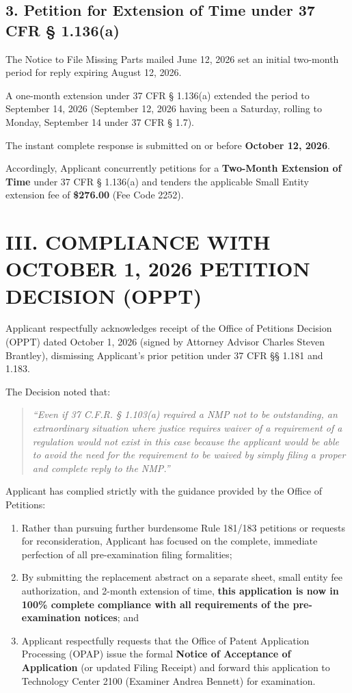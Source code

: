 \documentclass[11pt,letterpaper]{article}
\begin{document}
\subsection*{3. Petition for Extension of Time under 37 CFR \S{} 1.136(a)}

The Notice to File Missing Parts mailed June 12, 2026 set an initial two-month period for reply expiring August 12, 2026. 

A one-month extension under 37 CFR \S{} 1.136(a) extended the period to September 14, 2026 (September 12, 2026 having been a Saturday, rolling to Monday, September 14 under 37 CFR \S{} 1.7). 

The instant complete response is submitted on or before \textbf{October 12, 2026}. 

Accordingly, Applicant concurrently petitions for a \textbf{Two-Month Extension of Time} under 37 CFR \S{} 1.136(a) and tenders the applicable Small Entity extension fee of \textbf{\$276.00} (Fee Code 2252).

\newpage

\section*{III. COMPLIANCE WITH OCTOBER 1, 2026 PETITION DECISION (OPPT)}

Applicant respectfully acknowledges receipt of the Office of Petitions Decision (OPPT) dated October 1, 2026 (signed by Attorney Advisor Charles Steven Brantley), dismissing Applicant's prior petition under 37 CFR \S\S{} 1.181 and 1.183. 

The Decision noted that:
\begin{quote}
\textit{``Even if 37 C.F.R. § 1.103(a) required a NMP not to be outstanding, an extraordinary situation where justice requires waiver of a requirement of a regulation would not exist in this case because the applicant would be able to avoid the need for the requirement to be waived by simply filing a proper and complete reply to the NMP.''}
\end{quote}

Applicant has complied strictly with the guidance provided by the Office of Petitions:
\begin{enumerate}[leftmargin=2em, itemsep=2pt, parsep=0pt]
    \item Rather than pursuing further burdensome Rule 181/183 petitions or requests for reconsideration, Applicant has focused on the complete, immediate perfection of all pre-examination filing formalities;
    \item By submitting the replacement abstract on a separate sheet, small entity fee authorization, and 2-month extension of time, \textbf{this application is now in 100\% complete compliance with all requirements of the pre-examination notices}; and
    \item Applicant respectfully requests that the Office of Patent Application Processing (OPAP) issue the formal \textbf{Notice of Acceptance of Application} (or updated Filing Receipt) and forward this application to Technology Center 2100 (Examiner Andrea Bennett) for examination.
\end{enumerate}
\end{document}
